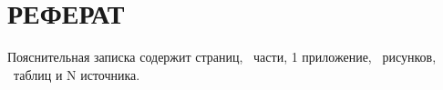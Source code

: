 \section*{РЕФЕРАТ}

\thispagestyle{empty}

Пояснительная записка содержит \pageref{LastPage} страниц, \totalsections\ части, 1 приложение, \totalfigures\ рисунков, \totaltables\ таблиц и N источника.


\vspace{1\baselineskip}
